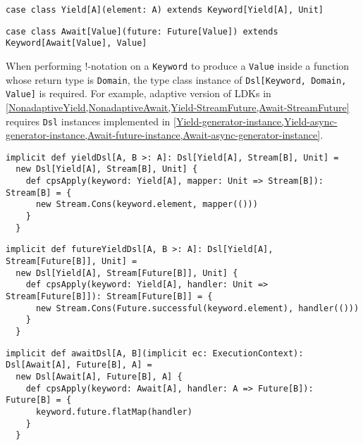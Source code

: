 \begin{lstlisting}[caption={The \lstinline{Yield} LDK, the adaptive version},label={Yield}]
case class Yield[A](element: A) extends Keyword[Yield[A], Unit]
\end{lstlisting}

\begin{lstlisting}[caption={The \lstinline{Await} LDK, the adaptive version},label={Await}]
case class Await[Value](future: Future[Value]) extends Keyword[Await[Value], Value]
\end{lstlisting}

When performing !-notation on a \lstinline{Keyword} to produce a \lstinline{Value} inside a function whose return type is \lstinline{Domain}, the type class instance of \lstinline{Dsl[Keyword, Domain, Value]} is required. For example, adaptive version of LDKs in \cref{NonadaptiveYield,NonadaptiveAwait,Yield-StreamFuture,Await-StreamFuture} requires \lstinline{Dsl} instances implemented in \cref{Yield-generator-instance,Yield-async-generator-instance,Await-future-instance,Await-async-generator-instance}.

\begin{lstlisting}[caption={The \lstinline{Dsl} type class instance of \lstinline{Yield} for creating generators},label={Yield-generator-instance}]
implicit def yieldDsl[A, B >: A]: Dsl[Yield[A], Stream[B], Unit] =
  new Dsl[Yield[A], Stream[B], Unit] {
    def cpsApply(keyword: Yield[A], mapper: Unit => Stream[B]): Stream[B] = {
      new Stream.Cons(keyword.element, mapper(()))
    }
  }
\end{lstlisting}

\begin{lstlisting}[caption={The \lstinline{Dsl} type class instance of \lstinline{Yield} for creating asynchronous generators},label={Yield-async-generator-instance}]
implicit def futureYieldDsl[A, B >: A]: Dsl[Yield[A], Stream[Future[B]], Unit] =
  new Dsl[Yield[A], Stream[Future[B]], Unit] {
    def cpsApply(keyword: Yield[A], handler: Unit => Stream[Future[B]]): Stream[Future[B]] = {
      new Stream.Cons(Future.successful(keyword.element), handler(()))
    }
  }
\end{lstlisting}

\begin{lstlisting}[caption={The \lstinline{Dsl} type class instance of \lstinline{Await} for creating asynchronous values},label={Await-future-instance}]
implicit def awaitDsl[A, B](implicit ec: ExecutionContext): Dsl[Await[A], Future[B], A] =
  new Dsl[Await[A], Future[B], A] {
    def cpsApply(keyword: Await[A], handler: A => Future[B]): Future[B] = {
      keyword.future.flatMap(handler)
    }
  }
\end{lstlisting}

